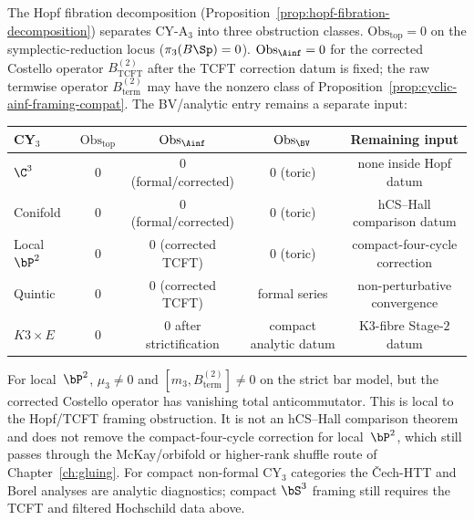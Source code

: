 \begin{remark}
\label{rem:hopf-reduction}
The Hopf fibration decomposition (Proposition~\ref{prop:hopf-fibration-decomposition}) separates CY-A$_3$ into three obstruction classes. $\mathrm{Obs}_{\mathrm{top}} = 0$ on the symplectic-reduction locus ($\pi_3(B\Sp) = 0$). $\mathrm{Obs}_{\Ainf} = 0$ for the corrected Costello operator $B^{(2)}_{\mathrm{TCFT}}$ after the TCFT correction datum is fixed; the raw termwise operator $B^{(2)}_{\mathrm{term}}$ may have the nonzero class of Proposition~\ref{prop:cyclic-ainf-framing-compat}. The BV/analytic entry remains a separate input:
\begin{center}
\renewcommand{\arraystretch}{1.2}
\small
\begin{tabular}{lcccc}
 \toprule
 \textbf{CY$_3$} & $\mathrm{Obs}_{\mathrm{top}}$ & $\mathrm{Obs}_{\Ainf}$ & $\mathrm{Obs}_{\BV}$ & \textbf{Remaining input} \\
 \midrule
 $\C^3$ & $0$ & $0$ (formal/corrected) & $0$ (toric) & none inside Hopf datum \\
 Conifold & $0$ & $0$ (formal/corrected) & $0$ (toric) & hCS--Hall comparison datum \\
 Local $\bP^2$ & $0$ & $0$ (corrected TCFT) & $0$ (toric) & compact-four-cycle correction \\
 Quintic & $0$ & $0$ (corrected TCFT) & formal series & non-perturbative convergence \\
 $K3 \times E$ & $0$ & $0$ after strictification & compact analytic datum & K3-fibre Stage-$2$ datum \\
 \bottomrule
\end{tabular}
\end{center}
For local~$\bP^2$, $\mu_3\neq0$ and
$[m_3,B^{(2)}_{\mathrm{term}}]\neq0$ on the strict bar model, but the
corrected Costello operator has vanishing total anticommutator. This is
local to the Hopf/TCFT framing obstruction. It is not an hCS--Hall
comparison theorem and does not remove the compact-four-cycle correction
for local~$\bP^2$, which still passes through the McKay/orbifold or
higher-rank shuffle route of Chapter~\ref{ch:gluing}. For compact
non-formal CY$_3$ categories the \v{C}ech-HTT and Borel analyses are
analytic diagnostics; compact $\bS^3$ framing still requires the TCFT and
filtered Hochschild data above.
\end{remark}



